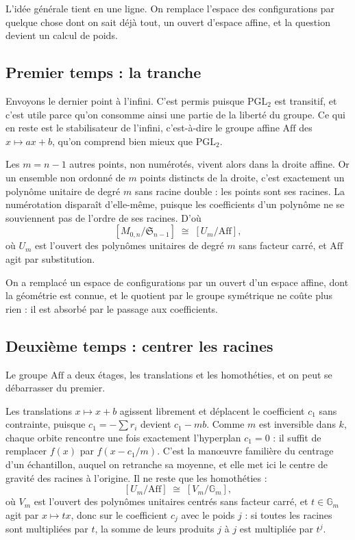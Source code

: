 \documentclass[11pt,a4paper]{amsart}
\theoremstyle{definition}
\theoremstyle{plain}
\theoremstyle{remark}
\newcommand{\M}{M_{0,n}}
\newcommand{\Sn}{\mathfrak S}
\newcommand{\Aff}{\mathrm{Aff}}
\newcommand{\Gm}{\mathbb G_m}
\begin{document}
L'idée générale tient en une ligne. On remplace l'espace des configurations par quelque chose dont on sait déjà tout, un ouvert d'espace affine, et la question devient un calcul de poids.

\subsection{Premier temps : la tranche}

Envoyons le dernier point à l'infini. C'est permis puisque $\mathrm{PGL}_2$ est transitif, et c'est utile parce qu'on consomme ainsi une partie de la liberté du groupe. Ce qui en reste est le stabilisateur de l'infini, c'est-à-dire le groupe affine $\Aff$ des $x \mapsto ax+b$, qu'on comprend bien mieux que $\mathrm{PGL}_2$.

Les $m = n-1$ autres points, non numérotés, vivent alors dans la droite affine. Or un ensemble non ordonné de $m$ points distincts de la droite, c'est exactement un polynôme unitaire de degré $m$ sans racine double : les points sont ses racines. La numérotation disparaît d'elle-même, puisque les coefficients d'un polynôme ne se souviennent pas de l'ordre de ses racines. D'où
\[
[\M/\Sn_{n-1}] \;\cong\; [U_m/\Aff],
\]
où $U_m$ est l'ouvert des polynômes unitaires de degré $m$ sans facteur carré, et $\Aff$ agit par substitution.

On a remplacé un espace de configurations par un ouvert d'un espace affine, dont la géométrie est connue, et le quotient par le groupe symétrique ne coûte plus rien : il est absorbé par le passage aux coefficients.

\subsection{Deuxième temps : centrer les racines}

Le groupe $\Aff$ a deux étages, les translations et les homothéties, et on peut se débarrasser du premier.

Les translations $x \mapsto x+b$ agissent librement et déplacent le coefficient $c_1$ sans contrainte, puisque $c_1 = -\sum r_i$ devient $c_1 - mb$. Comme $m$ est inversible dans $k$, chaque orbite rencontre une fois exactement l'hyperplan $c_1 = 0$ : il suffit de remplacer $f(x)$ par $f(x - c_1/m)$. C'est la manœuvre familière du centrage d'un échantillon, auquel on retranche sa moyenne, et elle met ici le centre de gravité des racines à l'origine. Il ne reste que les homothéties :
\[
[U_m/\Aff] \;\cong\; [V_m/\Gm],
\]
où $V_m$ est l'ouvert des polynômes unitaires centrés sans facteur carré, et $t \in \Gm$ agit par $x \mapsto tx$, donc sur le coefficient $c_j$ avec le poids $j$ : si toutes les racines sont multipliées par $t$, la somme de leurs produits $j$ à $j$ est multipliée par $t^j$.
\end{document}
